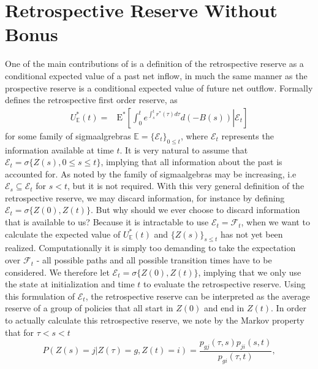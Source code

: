 \documentclass[12pt]{article}
\newcommand{\E}{\text{E}}
\newcommand{\indic}[1]{\mathds{1}_{ \{ #1 \} }}
\theoremstyle{my_thm}
\begin{document}
\section{Retrospective Reserve Without Bonus} \label{sec:Nor}
One of the main contributions of \citet{Norberg} is a definition of the retrospective reserve as a conditional expected value of a past net inflow, in much the same manner as the prospective reserve is a conditional expected value of future net outflow. Formally \citet{Norberg} defines the retrospective first order reserve, as
\begin{align*}
U^*_\mathbb{E}(t)=&\E^*  \left. \left[ \int_0^t e^{\int_s^t r^*(\tau) d\tau} d(-B(s)) \right| \mathcal{E}_t \right] 
\end{align*} 
for some family of sigmaalgrebras $\mathbb{E}=\{\mathcal{E}_t \}_{0\leq t}$, where $\mathcal{E}_t$ represents the information available at time $t$. It is very natural to assume that $\mathcal{E}_t=\sigma\{ Z(s), 0 \leq s\leq t \}$, implying that all information about the past is accounted for. As noted by \citet{Norberg} the family of sigmaalgebras may be increasing, i.e $\mathcal{E}_s \subseteq \mathcal{E}_t$ for $s<t$, but it is not required. With this very general definition of the retrospective reserve, we may discard information, for instance by defining $\mathcal{E}_t=\sigma \{Z(0), Z(t) \}$. But why should we ever choose to discard information that is available to us? Because it is intractable to use $\mathcal{E}_t=\mathcal{F}_t$, when we want to calculate the expected value of $U^*_\mathbb{E}(t)$ and $\{ Z(s) \}_{s\leq t}$ has not yet been realized. Computationally it is simply too demanding to take the expectation over $\mathcal{F}_t$ - all possible paths and all possible transition times have to be considered. We therefore let $\mathcal{E}_t=\sigma \{Z(0), Z(t) \}$, implying that we only use the state at initialization and time $t$ to evaluate the retrospective reserve. Using this formulation of $\mathcal{E}_t$, the retrospective reserve can be interpreted as the average reserve of a group of policies that all start in $Z(0)$ and end in $Z(t)$. In order to actually calculate this retrospective reserve, we note by the Markov property that for $\tau < s < t$
\begin{equation}
P(Z(s)=j| Z(\tau)=g, Z(t)=i )=\frac{p_{gj}(\tau,s)p_{ji}(s,t)}{p_{gi}(\tau,t)},
\label{eq:AAM}
\end{equation}
\end{document}
